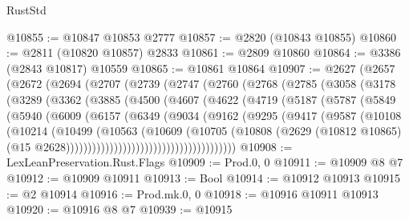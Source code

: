 \begin{lexlean}{RustStd}
\begin{coremodule}
@10855 := @10847 @10853 @2777
@10857 := @2820 (@10843 @10855)
@10860 := @2811 (@10820 @10857) @2833
@10861 := @2809 @10860
@10864 := @3386 (@2843 @10817) @10559
@10865 := @10861 @10864
@10907 := @2627
    (@2657
      (@2672
        (@2694
          (@2707
            (@2739
              (@2747
                (@2760
                  (@2768
                    (@2785
                      (@3058
                        (@3178
                          (@3289
                            (@3362
                              (@3885
                                (@4500
                                  (@4607
                                    (@4622
                                      (@4719
                                        (@5187
                                          (@5787
                                            (@5849
                                              (@5940
                                                (@6009
                                                  (@6157
                                                    (@6349
                                                      (@9034
                                                        (@9162
                                                          (@9295
                                                            (@9417
                                                              (@9587
                                                                (@10108
                                                                  (@10214
                                                                    (@10499
                                                                      (@10563
                                                                        (@10609
                                                                          (@10705
                                                                            (@10808
                                                                              (@2629
                                                                                (@10812 @10865)
                                                                                (@15
                                                                                  @2628)))))))))))))))))))))))))))))))))))))))
@10908 := LexLeanPreservation.Rust.Flags
@10909 := Prod.{0, 0}
@10911 := @10909 @8 @7
@10912 := @10909 @10911
@10913 := Bool
@10914 := @10912 @10913
@10915 := @2 @10914
@10916 := Prod.mk.{0, 0}
@10918 := @10916 @10911 @10913
@10920 := @10916 @8 @7
@10939 := @10915

\end{coremodule}
\end{lexlean}
